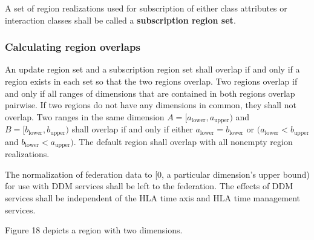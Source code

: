 \begin{compactstdpage}
    A set of region realizations used for subscription of either class attributes or interaction classes shall be called a \textbf{subscription region set}.

    \subsubsection{Calculating region overlaps}

    An update region set and a subscription region set shall overlap if and only if a region exists in each set so that the two regions overlap. Two regions overlap if and only if all ranges of dimensions that are contained in both regions overlap pairwise. If two regions do not have any dimensions in common, they shall not overlap. Two ranges in the same dimension $A = [a_{\mathrm{lower}}, a_{\mathrm{upper}})$ and $B = [b_{\mathrm{lower}}, b_{\mathrm{upper}})$ shall overlap if and only if either $a_{\mathrm{lower}} = b_{\mathrm{lower}}$ or $(a_{\mathrm{lower}} < b_{\mathrm{upper}}$ and $b_{\mathrm{lower}} < a_{\mathrm{upper}})$. The default region shall overlap with all nonempty region realizations.

    The normalization of federation data to [0, a particular dimension's upper bound) for use with DDM services shall be left to the federation. The effects of DDM services shall be independent of the HLA time axis and HLA time management services.

    Figure 18 depicts a region with two dimensions.

\end{compactstdpage}

\clearpage

